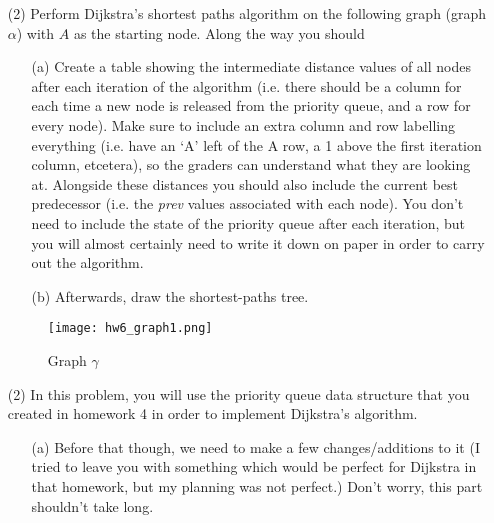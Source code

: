\documentclass[12pt]{article}
\begin{document}
\begin{enumerate}
\begin{center}
    \end{center}
    \item[(2)] Perform Dijkstra's shortest paths algorithm on the following graph (graph $\alpha$) with $A$ as the starting node. Along the way you should
    \begin{itemize}
        \item[(a)] Create a table showing the intermediate distance values of all nodes after each iteration of the algorithm (i.e. there should be a column for each time a new node is released from the priority queue, and a row for every node). Make sure to include an extra column and row labelling everything (i.e. have an `A' left of the A row, a 1 above the first iteration column, etcetera), so the graders can understand what they are looking at. Alongside these distances you should also include the current best predecessor (i.e. the \emph{prev} values associated with each node). You don't need to include the state of the priority queue after each iteration, but you will almost certainly need to write it down on paper in order to carry out the algorithm.
        \item[(b)] Afterwards, draw the shortest-paths tree. 
    \end{itemize}
    \begin{figure}[h]
        \centering
        \texttt{[image: hw6\_graph1.png]}
        \caption{Graph $\gamma$}
    \end{figure}
    \item[(2)] In this problem, you will use the priority queue data structure that you created in homework 4 in order to implement Dijkstra's algorithm. 
    \begin{itemize}
        \item[(a)] Before that though, we need to make a few changes/additions to it (I tried to leave you with something which would be perfect for Dijkstra in that homework, but my planning was not perfect.) Don't worry, this part shouldn't take long.

\end{itemize}
\end{enumerate}
\end{document}
